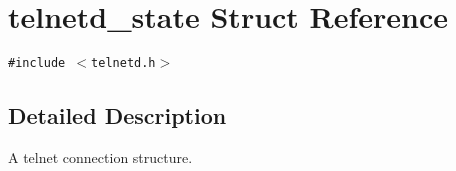 \hypertarget{a00027}{
\section{telnetd\_\-state Struct Reference}
\label{a00027}
}
{\tt \#include $<$telnetd.h$>$}



\subsection{Detailed Description}
A telnet connection structure. 

